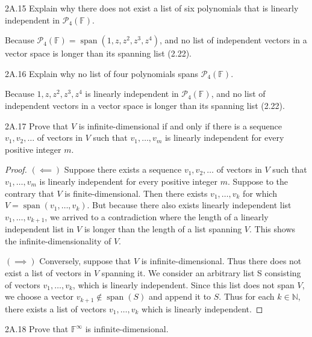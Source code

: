 \documentclass{exam}
\DeclareMathOperator{\spn}{span}
\begin{document}
\begin{problem}{2A.15}
    Explain why there does not exist a list of six polynomials that is linearly independent in $\mathcal P_4(\mathbb F)$.
\end{problem}
Because $\mathcal P_4(\mathbb F) = \spn(1, z, z^2, z^3, z^4)$, and no list of independent vectors in a vector space is longer than its spanning list (2.22).

\begin{problem}{2A.16}
    Explain why no list of four polynomials spans $\mathcal P_4(\mathbb F)$.
\end{problem}
Because $1, z, z^2, z^3, z^4$ is linearly independent in $\mathcal P_4(\mathbb F)$, and no list of independent vectors in a vector space is longer than its spanning list (2.22).

\begin{problem}{2A.17}
    Prove that $V$ is infinite-dimensional if and only if there is a sequence $v_1, v_2, \dots$ of vectors in $V$ such that $v_1, \dots, v_m$ is linearly independent for every positive integer $m$.
\end{problem}

\begin{proof}
    $(\impliedby)$ Suppose there exists a sequence $v_1, v_2, \dots$ of vectors in $V$ such that $v_1, \dots, v_m$ is linearly independent for every positive integer $m$. Suppose to the contrary that $V$ is finite-dimensional. Then there exists $v_1, \dots, v_k$ for which $V = \spn(v_1, \dots, v_k)$. But because there also exists linearly independent list $v_1, \dots, v_{k+1}$, we arrived to a contradiction where the length of a linearly independent list in $V$ is longer than the length of a list spanning $V$. This shows the infinite-dimensionality of $V$.

    $(\implies)$ Conversely, suppose that $V$ is infinite-dimensional. Thus there does not exist a list of vectors in $V$ spanning it. We consider an arbitrary list S consisting of vectors $v_1, \dots, v_k$, which is linearly independent. Since this list does not span $V$, we choose a vector $v_{k+1}\notin \spn(S)$ and append it to $S$. Thus for each $k\in\mathbb N$, there exists a list of vectors $v_1, \dots, v_k$ which is linearly independent.
\end{proof}

\begin{problem}{2A.18}
    Prove that $\mathbb F^{\infty}$ is infinite-dimensional.
\end{problem}
\end{document}
